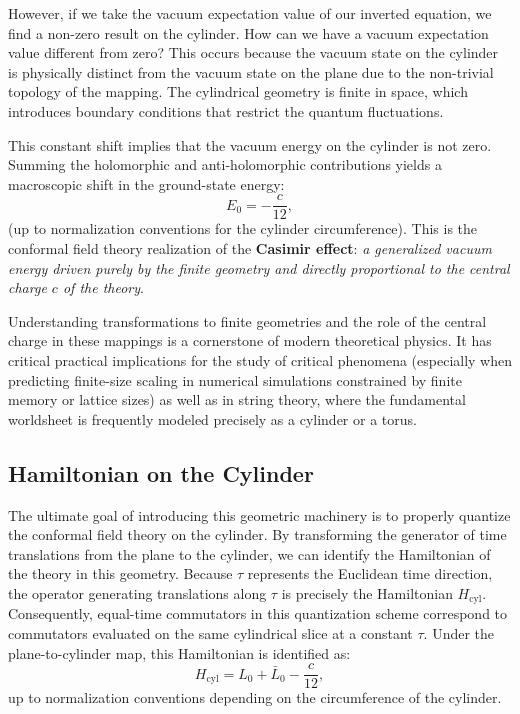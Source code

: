 However, if we take the vacuum expectation value of our inverted equation, we find a non-zero result on the cylinder. How can we have a vacuum expectation value different from zero? This occurs because the vacuum state on the cylinder is physically distinct from the vacuum state on the plane due to the non-trivial topology of the mapping. The cylindrical geometry is finite in space, which introduces boundary conditions that restrict the quantum fluctuations.

This constant shift implies that the vacuum energy on the cylinder is not zero. Summing the holomorphic and anti-holomorphic contributions yields a macroscopic shift in the ground-state energy:
\[
    E_0 = -\frac{c}{12},
\]
(up to normalization conventions for the cylinder circumference). This is the conformal field theory realization of the \textbf{Casimir effect}: \textit{a generalized vacuum energy driven purely by the finite geometry and directly proportional to the central charge \(c\) of the theory}.

Understanding transformations to finite geometries and the role of the central charge in these mappings is a cornerstone of modern theoretical physics. It has critical practical implications for the study of critical phenomena (especially when predicting finite-size scaling in numerical simulations constrained by finite memory or lattice sizes) as well as in string theory, where the fundamental worldsheet is frequently modeled precisely as a cylinder or a torus.

\subsection{Hamiltonian on the Cylinder}

The ultimate goal of introducing this geometric machinery is to properly quantize the conformal field theory on the cylinder. By transforming the generator of time translations from the plane to the cylinder, we can identify the Hamiltonian of the theory in this geometry. Because \(\tau\) represents the Euclidean time direction, the operator generating translations along \(\tau\) is precisely the Hamiltonian \(H_{\text{cyl}}\). Consequently, equal-time commutators in this quantization scheme correspond to commutators evaluated on the same cylindrical slice at a constant \(\tau\). Under the plane-to-cylinder map, this Hamiltonian is identified as:
\[
    H_{\text{cyl}} = L_0 + \bar{L}_0 - \frac{c}{12},
\]
up to normalization conventions depending on the circumference of the cylinder.

